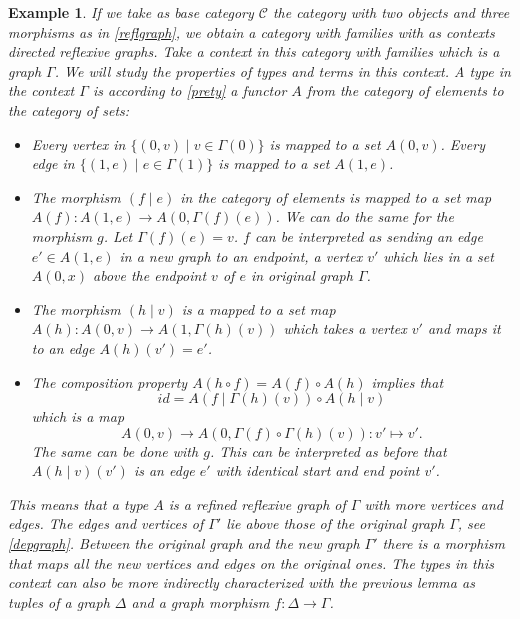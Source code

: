 \documentclass[12pt,a4paper,twoside,xetex,draft]{book}
\newtheorem{example}[theorem]{Example}
\begin{document}
\begin{example}
If we take as base category $\mathcal{C}$ the category with two objects and three morphisms as in \cref{reflgraph}, we obtain a category with families with as contexts directed reflexive graphs. Take a context in this category with families which is a graph $\Gamma$. We will study the properties of types and terms in this context. A type in the context $\Gamma$ is according to \cref{prety} a functor $A$ from the category of elements to the category of sets:
\begin{itemize}
\item Every vertex in $\{ (0, v) \mid v \in \Gamma (0) \}$ is mapped to a set $A(0,v)$. Every edge in $\{ (1, e) \mid e \in \Gamma (1) \}$ is mapped to a set $A(1,e)$.

\item The morphism $(f \mid e)$ in the category of elements is mapped to a set map $A(f): A(1,e) \rightarrow A(0, \Gamma (f) (e))$.  We can do the same for the morphism $g$. Let $\Gamma (f) (e) =v$. $f$ can be interpreted as sending an edge $e' \in A(1,e)$ in a new graph to an endpoint, a vertex $v'$ which lies in a set $A(0, x)$ above the endpoint $v$ of $e$ in original graph $\Gamma$.
 
\item The morphism $(h \mid v)$ is a mapped to a set map $A(h) : A(0,v) \rightarrow A(1, \Gamma (h) (v) )$ which takes a vertex $v'$ and maps it to an edge $A(h)(v')=e'$.

\item The composition property $A(h \circ f) = A(f) \circ A(h)$ implies that $$id = A \left( f \mid \Gamma (h) (v) \right) \circ A \left( h \mid v \right)$$ which is a map $$A(0,v) \rightarrow A(0, \Gamma (f) \circ \Gamma (h) (v)): v' \mapsto v'.$$ The same can be done with $g$. This can be interpreted as before that $A(h \mid v)(v')$ is an edge $e'$ with identical start and end point $v'$.
\end{itemize}

This means that a type $A$ is a refined reflexive graph of $\Gamma$ with more vertices and edges. The edges and vertices of $\Gamma '$ lie above those of the original graph $\Gamma$, see \cref{depgraph}. Between the original graph and the new graph $\Gamma'$ there is a morphism that maps all the new vertices and edges on the original ones. The types in this context can also be more indirectly characterized with the previous lemma as tuples of a graph $\Delta$ and a graph morphism $f:\Delta \rightarrow \Gamma$.


\end{example}
\end{document}
